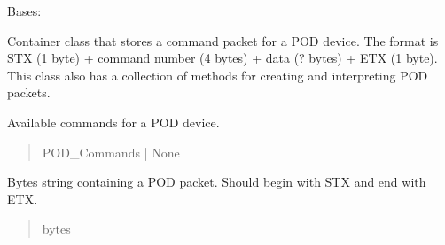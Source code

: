 \documentclass[letterpaper,10pt,english]{sphinxmanual}
\begin{document}
\begin{fulllineitems}
\label{\detokenize{PodApi.Packets:PodApi.Packets.Packet.Packet}}
\pysigstartsignatures
{}
\pysigstopsignatures
\sphinxAtStartPar
Bases: 

\sphinxAtStartPar
Container class that stores a command packet for a POD device. The format is     STX (1 byte) + command number (4 bytes) + data (? bytes) + ETX (1 byte). This class     also has a collection of methods for creating and interpreting POD packets.

\begin{fulllineitems}
\label{\detokenize{PodApi.Packets:PodApi.Packets.Packet.Packet._commands}}
\pysigstartsignatures
{}
\pysigstopsignatures
\sphinxAtStartPar
Available commands for a POD device.
\begin{quote}\begin{description}
\sphinxAtStartPar
POD\_Commands | None

\end{description}\end{quote}

\end{fulllineitems}


\begin{fulllineitems}
\label{\detokenize{PodApi.Packets:PodApi.Packets.Packet.Packet.rawPacket}}
\pysigstartsignatures
{}
\pysigstopsignatures
\sphinxAtStartPar
Bytes string containing a POD packet. Should begin with             STX and end with ETX.
\begin{quote}\begin{description}
\sphinxAtStartPar
bytes


\end{description}
\end{quote}
\end{fulllineitems}
\end{fulllineitems}
\end{document}
